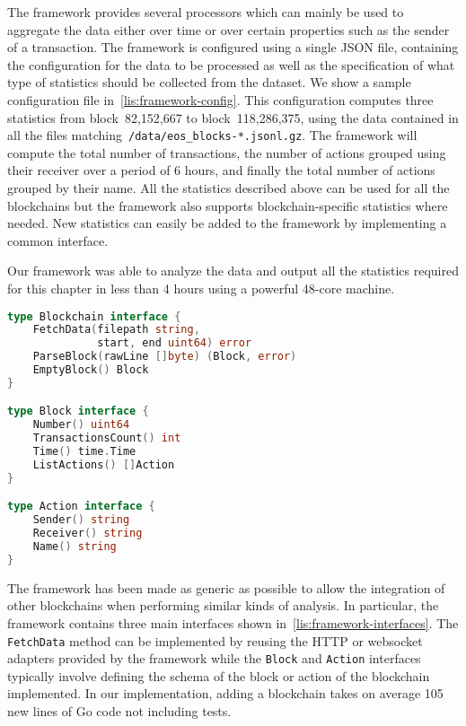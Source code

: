 The framework provides several processors which can mainly be used to aggregate the data either over time or over certain properties such as the sender of a transaction.
The framework is configured using a single JSON file, containing the configuration for the data to be processed as well as the specification of what type of statistics should be collected from the dataset. We show a sample configuration file in~\autoref{lis:framework-config}.
This configuration computes three statistics from block~82,152,667 to block~118,286,375, using the data contained in all the files matching~\lstinline{/data/eos_blocks-*.jsonl.gz}.
The framework will compute the total number of transactions, the number of actions grouped using their receiver over a period of 6 hours, and finally the total number of actions grouped by their name.
All the statistics described above can be used for all the blockchains but the framework also supports blockchain-specific statistics where needed.
New statistics can easily be added to the framework by implementing a common interface.

Our framework was able to analyze the data and output all the statistics required for this chapter in less than 4 hours using a powerful 48-core machine.

\begin{lstlisting}[language=go,float=ht,floatplacement=ht,caption=Main interfaces of our measurement framework,label=lis:framework-interfaces]
type Blockchain interface {
    FetchData(filepath string,
              start, end uint64) error
    ParseBlock(rawLine []byte) (Block, error)
    EmptyBlock() Block
}

type Block interface {
    Number() uint64
    TransactionsCount() int
    Time() time.Time
    ListActions() []Action
}

type Action interface {
    Sender() string
    Receiver() string
    Name() string
}
\end{lstlisting}

The framework has been made as generic as possible to allow the integration of other blockchains when performing similar kinds of analysis.
In particular, the framework contains three main interfaces shown in~\autoref{lis:framework-interfaces}.
The \lstinline{FetchData} method can be implemented by reusing the HTTP or websocket adapters provided by the framework while the \lstinline{Block} and \lstinline{Action} interfaces typically involve defining the schema of the block or action of the blockchain implemented.
In our implementation, adding a blockchain takes on average 105 new lines of Go code not including tests.


